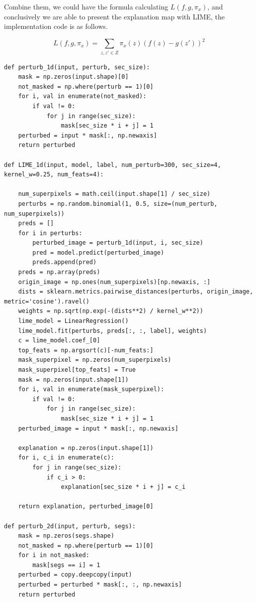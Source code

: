 \documentclass[conference]{IEEEtran}
\begin{document}
Combine them, we could have the formula calculating $L(f,g,{\pi}_{x})$, and conclusively we are able to present the explanation map with LIME, the implementation code is as follows.

$$L(f,g,{\pi}_{x})=\sum_{z,z'{\in}Z}{\pi}_{x}(z){(f(z)-g(z'))}^2$$

\begin{lstlisting}[title={LIME Algorithm Implementation},label={lime}]
def perturb_1d(input, perturb, sec_size):
    mask = np.zeros(input.shape)[0]
    not_masked = np.where(perturb == 1)[0]
    for i, val in enumerate(not_masked):
        if val != 0:
            for j in range(sec_size):
                mask[sec_size * i + j] = 1
    perturbed = input * mask[:, np.newaxis]
    return perturbed

def LIME_1d(input, model, label, num_perturb=300, sec_size=4, kernel_w=0.25, num_feats=4):

    num_superpixels = math.ceil(input.shape[1] / sec_size)
    perturbs = np.random.binomial(1, 0.5, size=(num_perturb, num_superpixels))
    preds = []
    for i in perturbs:
        perturbed_image = perturb_1d(input, i, sec_size)
        pred = model.predict(perturbed_image)
        preds.append(pred)
    preds = np.array(preds)
    origin_image = np.ones(num_superpixels)[np.newaxis, :]
    dists = sklearn.metrics.pairwise_distances(perturbs, origin_image, metric='cosine').ravel()
    weights = np.sqrt(np.exp(-(dists**2) / kernel_w**2))
    lime_model = LinearRegression()
    lime_model.fit(perturbs, preds[:, :, label], weights)
    c = lime_model.coef_[0]
    top_feats = np.argsort(c)[-num_feats:]
    mask_superpixel = np.zeros(num_superpixels)
    mask_superpixel[top_feats] = True
    mask = np.zeros(input.shape[1])
    for i, val in enumerate(mask_superpixel):
        if val != 0:
            for j in range(sec_size):
                mask[sec_size * i + j] = 1
    perturbed_image = input * mask[:, np.newaxis]

    explanation = np.zeros(input.shape[1])
    for i, c_i in enumerate(c):
        for j in range(sec_size):
            if c_i > 0:
                explanation[sec_size * i + j] = c_i

    return explanation, perturbed_image[0]

def perturb_2d(input, perturb, segs):
    mask = np.zeros(segs.shape)
    not_masked = np.where(perturb == 1)[0]
    for i in not_masked:
        mask[segs == i] = 1
    perturbed = copy.deepcopy(input)
    perturbed = perturbed * mask[:, :, np.newaxis]
    return perturbed



\end{lstlisting}
\end{document}
